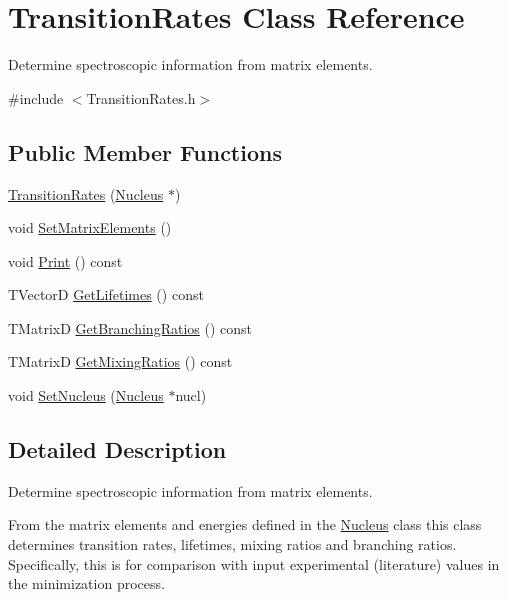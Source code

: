 \hypertarget{classTransitionRates}{\section{Transition\-Rates Class Reference}
\label{classTransitionRates}
}


Determine spectroscopic information from matrix elements.  




{\ttfamily \#include $<$Transition\-Rates.\-h$>$}

\subsection*{Public Member Functions}
\begin{DoxyCompactItemize}
\item 
\hyperlink{classTransitionRates_ad00aaf48b7c94926a5c9f0b0d03b42c8}{Transition\-Rates} (\hyperlink{classNucleus}{Nucleus} $\ast$)
\item 
void \hyperlink{classTransitionRates_a7601fbf2a719b9da760224c6204157fa}{Set\-Matrix\-Elements} ()
\item 
void \hyperlink{classTransitionRates_aa6b4319cdf1d3fe9a983df698b3a4b20}{Print} () const 
\item 
T\-Vector\-D \hyperlink{classTransitionRates_afe1e8c779441b1d54debf169fcd6936e}{Get\-Lifetimes} () const 
\item 
T\-Matrix\-D \hyperlink{classTransitionRates_a187b19b9f3da2d284644455ece9b5204}{Get\-Branching\-Ratios} () const 
\item 
T\-Matrix\-D \hyperlink{classTransitionRates_a7bd21177c625ea6e51c45ef66bd28275}{Get\-Mixing\-Ratios} () const 
\item 
void \hyperlink{classTransitionRates_a667cc48402a7a5b06826b3c9993d0ca2}{Set\-Nucleus} (\hyperlink{classNucleus}{Nucleus} $\ast$nucl)
\end{DoxyCompactItemize}


\subsection{Detailed Description}
Determine spectroscopic information from matrix elements. 

From the matrix elements and energies defined in the \hyperlink{classNucleus}{Nucleus} class this class determines transition rates, lifetimes, mixing ratios and branching ratios. Specifically, this is for comparison with input experimental (literature) values in the minimization process. 

